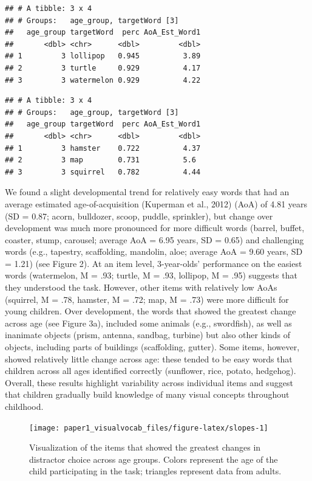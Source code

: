 \documentclass[
  man,mask]{apa6}
\begin{document}
\begin{verbatim}
## # A tibble: 3 x 4
## # Groups:   age_group, targetWord [3]
##   age_group targetWord  perc AoA_Est_Word1
##       <dbl> <chr>      <dbl>         <dbl>
## 1         3 lollipop   0.945          3.89
## 2         3 turtle     0.929          4.17
## 3         3 watermelon 0.929          4.22
\end{verbatim}

\begin{verbatim}
## # A tibble: 3 x 4
## # Groups:   age_group, targetWord [3]
##   age_group targetWord  perc AoA_Est_Word1
##       <dbl> <chr>      <dbl>         <dbl>
## 1         3 hamster    0.722          4.37
## 2         3 map        0.731          5.6 
## 3         3 squirrel   0.782          4.44
\end{verbatim}

We found a slight developmental trend for relatively easy words that had an average estimated age-of-acquisition (Kuperman et al., 2012) (AoA) of 4.81 years (SD = 0.87; acorn, bulldozer, scoop, puddle, sprinkler), but change over development was much more pronounced for more difficult words (barrel, buffet, coaster, stump, carousel; average AoA = 6.95 years, SD = 0.65) and challenging words (e.g., tapestry, scaffolding, mandolin, aloe; average AoA = 9.60 years, SD = 1.21) (see Figure 2). At an item level, 3-year-olds' performance on the easiest words (watermelon, M = .93; turtle, M = .93, lollipop, M = .95) suggests that they understood the task. However, other items with relatively low AoAs (squirrel, M = .78, hamster, M = .72; map, M = .73) were more difficult for young children. Over development, the words that showed the greatest change across age (see Figure 3a), included some animals (e.g., swordfish), as well as inanimate objects (prism, antenna, sandbag, turbine) but also other kinds of objects, including parts of buildings (scaffolding, gutter). Some items, however, showed relatively little change across age: these tended to be easy words that children across all ages identified correctly (sunflower, rice, potato, hedgehog). Overall, these results highlight variability across individual items and suggest that children gradually build knowledge of many visual concepts throughout childhood.

\begin{figure}[H]

{\centering \texttt{[image: paper1\_visualvocab\_files/figure-latex/slopes-1]} 

}

\caption{Visualization of the items that showed the greatest changes in distractor choice across age groups. Colors represent the age of the child participating in the task; triangles represent data from adults.}\label{fig:slopes}
\end{figure}
\end{document}
